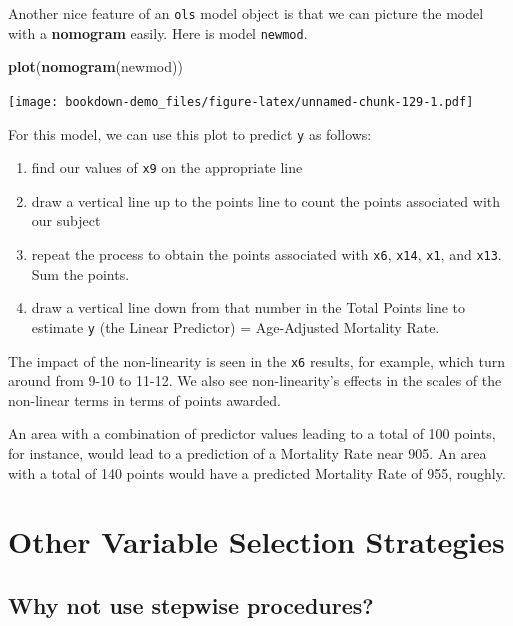 \documentclass[]{book}
\newenvironment{Shaded}{\begin{snugshade}}{\end{snugshade}}
\newcommand{\KeywordTok}[1]{\textcolor[rgb]{0.13,0.29,0.53}{\textbf{#1}}}
\newcommand{\NormalTok}[1]{#1}
\providecommand{\tightlist}{%
  \setlength{\itemsep}{0pt}\setlength{\parskip}{0pt}}
\theoremstyle{definition}
\theoremstyle{definition}
\theoremstyle{definition}
\theoremstyle{remark}
\begin{document}
Another nice feature of an \texttt{ols} model object is that we can
picture the model with a \textbf{nomogram} easily. Here is model
\texttt{newmod}.

\begin{Shaded}
\begin{Highlighting}[]
\KeywordTok{plot}\NormalTok{(}\KeywordTok{nomogram}\NormalTok{(newmod))}
\end{Highlighting}
\end{Shaded}

\texttt{[image: bookdown-demo\_files/figure-latex/unnamed-chunk-129-1.pdf]}

For this model, we can use this plot to predict \texttt{y} as follows:

\begin{enumerate}
\def\labelenumi{\arabic{enumi}.}
\tightlist
\item
  find our values of \texttt{x9} on the appropriate line
\item
  draw a vertical line up to the points line to count the points
  associated with our subject
\item
  repeat the process to obtain the points associated with \texttt{x6},
  \texttt{x14}, \texttt{x1}, and \texttt{x13}. Sum the points.
\item
  draw a vertical line down from that number in the Total Points line to
  estimate \texttt{y} (the Linear Predictor) = Age-Adjusted Mortality
  Rate.
\end{enumerate}

The impact of the non-linearity is seen in the \texttt{x6} results, for
example, which turn around from 9-10 to 11-12. We also see
non-linearity's effects in the scales of the non-linear terms in terms
of points awarded.

An area with a combination of predictor values leading to a total of 100
points, for instance, would lead to a prediction of a Mortality Rate
near 905. An area with a total of 140 points would have a predicted
Mortality Rate of 955, roughly.

\chapter{Other Variable Selection
Strategies}\label{other-variable-selection-strategies}

\section{Why not use stepwise
procedures?}\label{why-not-use-stepwise-procedures}
\end{document}
